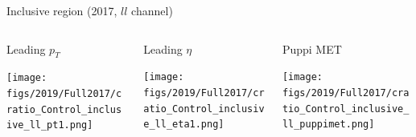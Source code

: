 \documentclass[9pt]{beamer}
\begin{document}
\begin{frame}{Inclusive region (2017, $ll$ channel)}
\justifying
\begin{columns}
		\hspace{5pt}
		\begin{column}{0.32\textwidth}
			\begin{center}
				\begin{block}{\centering Leading $p_T$}\end{block}	
     			\texttt{[image: figs/2019/Full2017/cratio\_Control\_inclusive\_ll\_pt1.png]}
    		\end{center}		
		\end{column} \hfill
		\begin{column}{0.32\textwidth}
			\begin{center}
				\begin{block}{\centering Leading $\eta$}\end{block}	
     			\texttt{[image: figs/2019/Full2017/cratio\_Control\_inclusive\_ll\_eta1.png]}
    		\end{center}		
		\end{column} \hfill
		\begin{column}{0.32\textwidth}
			\begin{center}
				\begin{block}{\centering Puppi MET}\end{block}	
     			\texttt{[image: figs/2019/Full2017/cratio\_Control\_inclusive\_ll\_puppimet.png]}
   			 \end{center}
		\end{column} \hfill
	\end{columns} \vspace{-5pt}
	\begin{columns}
		\hspace{5pt}

\end{columns}
\end{frame}
\end{document}
